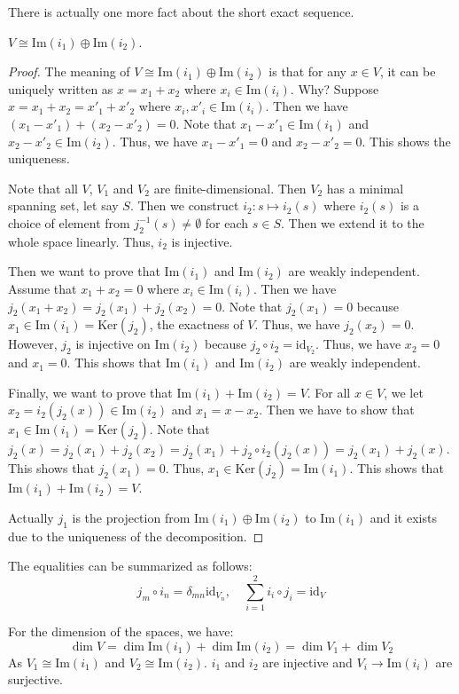 \documentclass[
	11pt, %
	fleqn, %
	a4paper, %
]{LegrandOrangeBook}
\renewcommand{\ker}[1]{\text{Ker}(#1)} %
\renewcommand{\Im}[1]{\text{Im}(#1)} %
\newcommand{\id}{\text{id}} %
\begin{document}
There is actually one more fact about the short exact sequence.
\begin{proposition}
    $V \cong \Im{i_1} \oplus \Im{i_2}$.
\end{proposition}
\begin{proof}
    The meaning of $V \cong \Im{i_1} \oplus \Im{i_2}$ is that for any $x \in V$, it can be uniquely written as $x = x_1 + x_2$ where $x_i \in \Im{i_i}$. Why? Suppose $x = x_1 + x_2 = x'_1 + x'_2$ where $x_i, x'_i \in \Im{i_i}$. Then we have $(x_1 - x'_1) + (x_2 - x'_2) = 0$. Note that $x_1 - x'_1 \in \Im{i_1}$ and $x_2 - x'_2 \in \Im{i_2}$. Thus, we have $x_1 - x'_1 = 0$ and $x_2 - x'_2 = 0$. This shows the uniqueness.

    Note that all $V$, $V_1$ and $V_2$ are finite-dimensional. Then $V_2$ has a minimal spanning set, let say $S$. Then we construct $i_2 : s \mapsto i_2(s)$ where $i_2(s)$ is a choice of element from $j_2^{-1}(s) \neq \emptyset$ for each $s \in S$. Then we extend it to the whole space linearly. Thus, $i_2$ is injective. 

    Then we want to prove that $\Im{i_1}$ and $\Im{i_2}$ are weakly independent. Assume that $x_1 + x_2 = 0$ where $x_i \in \Im{i_i}$. Then we have $j_2(x_1 + x_2) = j_2(x_1) + j_2(x_2) = 0$. Note that $j_2(x_1) = 0$ because $x_1 \in \Im{i_1} = \ker{j_2}$, the exactness of $V$. Thus, we have $j_2(x_2) = 0$. However, $j_2$ is injective on $\Im{i_2}$ because $j_2 \circ i_2 = \id_{V_2}$. Thus, we have $x_2 = 0$ and $x_1 = 0$. This shows that $\Im{i_1}$ and $\Im{i_2}$ are weakly independent.

    Finally, we want to prove that $\Im{i_1} + \Im{i_2} = V$. For all $x \in V$, we let $x_2 = i_2(j_2(x)) \in \Im{i_2}$ and $x_1 = x - x_2$. Then we have to show that $x_1 \in \Im{i_1} = \ker{j_2}$. Note that $j_2(x) = j_2(x_1) + j_2(x_2) = j_2(x_1) + j_2 \circ i_2(j_2(x)) = j_2(x_1) + j_2(x)$. This shows that $j_2(x_1) = 0$. Thus, $x_1 \in \ker{j_2} = \Im{i_1}$. This shows that $\Im{i_1} + \Im{i_2} = V$.

    Actually $j_1$ is the projection from $\Im{i_1} \oplus \Im{i_2}$ to $\Im{i_1}$ and it exists due to the uniqueness of the decomposition.
\end{proof}

The equalities can be summarized as follows:
\[
    j_m \circ i_n = \delta_{mn} \id_{V_n}, \quad \sum_{i=1}^{2} i_i \circ j_i = \id_V
\]

For the dimension of the spaces, we have:
\[
    \dim{V} = \dim{\Im{i_1}} + \dim{\Im{i_2}} = \dim{V_1} + \dim{V_2}
\]
As $V_1 \cong \Im{i_1}$ and $V_2 \cong \Im{i_2}$. $i_1$ and $i_2$ are injective and $V_i \to \Im{i_i}$ are surjective. 
\end{document}
